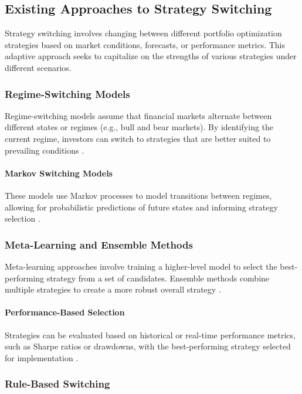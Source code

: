 \subsection{Existing Approaches to Strategy Switching}

Strategy switching involves changing between different portfolio optimization strategies based on market conditions, forecasts, or performance metrics. This adaptive approach seeks to capitalize on the strengths of various strategies under different scenarios.

\subsubsection{Regime-Switching Models}

Regime-switching models assume that financial markets alternate between different states or regimes (e.g., bull and bear markets). By identifying the current regime, investors can switch to strategies that are better suited to prevailing conditions \cite{ang2002regime}.

\paragraph{Markov Switching Models}

These models use Markov processes to model transitions between regimes, allowing for probabilistic predictions of future states and informing strategy selection \cite{hamilton1989new}.

\subsubsection{Meta-Learning and Ensemble Methods}

Meta-learning approaches involve training a higher-level model to select the best-performing strategy from a set of candidates. Ensemble methods combine multiple strategies to create a more robust overall strategy \cite{huang2019building}.

\paragraph{Performance-Based Selection}

Strategies can be evaluated based on historical or real-time performance metrics, such as Sharpe ratios or drawdowns, with the best-performing strategy selected for implementation \cite{poterba2000portfolio}.

\subsubsection{Rule-Based Switching}

